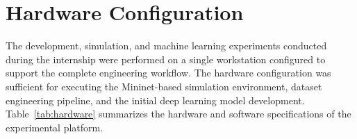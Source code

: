 \documentclass[12pt,a4paper]{report}
\begin{document}

	
	\section{Hardware Configuration}
	\label{sec:hardware}
	
	The development, simulation, and machine learning experiments conducted during the internship were performed on a single workstation configured to support the complete engineering workflow. The hardware configuration was sufficient for executing the Mininet-based simulation environment, dataset engineering pipeline, and the initial deep learning model development. Table~\ref{tab:hardware} summarizes the hardware and software specifications of the experimental platform.
	
\end{document}
